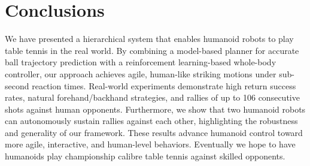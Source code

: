 \section{Conclusions}
We have presented a hierarchical system that enables humanoid robots to play table tennis in the real world. By combining a model-based planner for accurate ball trajectory prediction with a reinforcement learning-based whole-body controller, our approach achieves agile, human-like striking motions under sub-second reaction times. 
Real-world experiments demonstrate high return success rates, natural forehand/backhand strategies, and rallies of up to 106 consecutive shots against human opponents. Furthermore, we show that two humanoid robots can autonomously sustain rallies against each other, highlighting the robustness and generality of our framework. 
These results advance humanoid control toward more agile, interactive, and human-level behaviors. Eventually we hope to have humanoids play championship calibre table tennis against skilled opponents. 